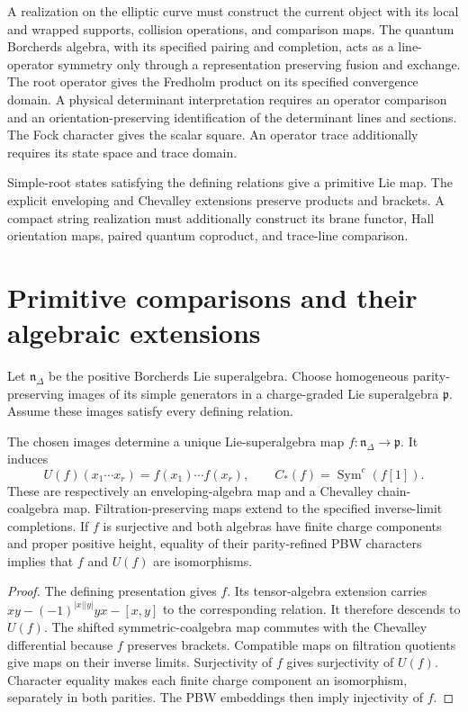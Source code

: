 A realization on the elliptic curve must construct the current object
with its local and wrapped supports, collision operations, and comparison maps.
The quantum Borcherds algebra, with its specified pairing and completion,
acts as a line-operator symmetry only through a representation preserving
fusion and exchange. The root operator gives the Fredholm product on its
specified convergence domain. A physical determinant interpretation requires
an operator comparison and an orientation-preserving identification of the
determinant lines and sections. The Fock character gives the scalar square.
An operator trace additionally requires its state space and trace domain.

Simple-root states satisfying the defining relations give a primitive Lie map.
The explicit enveloping and Chevalley extensions preserve products and brackets.
A compact string realization must additionally construct its brane functor,
Hall orientation maps, paired quantum coproduct, and trace-line comparison.

\chapter{Primitive comparisons and their algebraic extensions}
Let $\mathfrak n_\Delta$ be the positive Borcherds Lie superalgebra.
Choose homogeneous parity-preserving images of its simple generators
in a charge-graded Lie superalgebra $\mathfrak p$.
Assume these images satisfy every defining relation.

\begin{theorem}\label{cyiv:primitive-comparison}
The chosen images determine a unique Lie-superalgebra map
$f:\mathfrak n_\Delta\to\mathfrak p$.
It induces
\[
 U(f)(x_1\cdots x_r)=f(x_1)\cdots f(x_r),
 \qquad C_*(f)=\operatorname{Sym}^c(f[1]).
\]
These are respectively an enveloping-algebra map and a Chevalley
chain-coalgebra map.
Filtration-preserving maps extend to the specified inverse-limit
completions.
If $f$ is surjective and both algebras have finite charge components
and proper positive height, equality of their parity-refined PBW
characters implies that $f$ and $U(f)$ are isomorphisms.
\end{theorem}
\begin{proof}
The defining presentation gives $f$.
Its tensor-algebra extension carries
$xy-(-1)^{|x||y|}yx-[x,y]$ to the corresponding relation.
It therefore descends to $U(f)$.
The shifted symmetric-coalgebra map commutes with the Chevalley
differential because $f$ preserves brackets.
Compatible maps on filtration quotients give maps on their inverse limits.
Surjectivity of $f$ gives surjectivity of $U(f)$.
Character equality makes each finite charge component an isomorphism,
separately in both parities.
The PBW embeddings then imply injectivity of $f$.
\end{proof}

